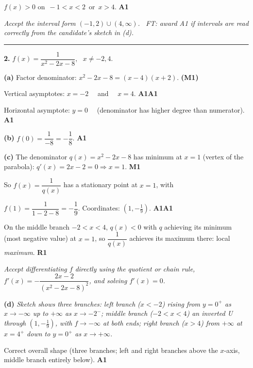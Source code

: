 \documentclass[12pt, twoside]{article}
\begin{document}
$f(x)>0$ on $\,-1<x<2\,$ or $\,x>4$. \hfill \textbf{A1}

\emph{Accept the interval form $(-1,2)\cup(4,\infty)$. \ FT: award A1 if intervals
are read correctly from the candidate's sketch in (d).}

\bigskip\hrule\bigskip

\noindent\textbf{2.} $\displaystyle f(x)=\dfrac{1}{x^{2}-2x-8}$, \ $x\ne -2,4$.

\medskip

\textbf{(a)} Factor denominator: $x^{2}-2x-8=(x-4)(x+2)$. \hfill \textbf{(M1)}

Vertical asymptotes: $x=-2$ \ \ and \ \ $x=4$. \hfill \textbf{A1A1}

Horizontal asymptote: $y=0$
\ \ (denominator has higher degree than numerator). \hfill \textbf{A1}

\medskip

\textbf{(b)} $f(0)=\dfrac{1}{-8}=-\dfrac{1}{8}$. \hfill \textbf{A1}

\medskip

\textbf{(c)} The denominator $q(x)=x^{2}-2x-8$ has minimum at $x=1$ (vertex of
the parabola): $q'(x)=2x-2=0 \Rightarrow x=1$. \hfill \textbf{M1}

\noindent So $f(x)=\dfrac{1}{q(x)}$ has a stationary point at $x=1$, with

$f(1)=\dfrac{1}{1-2-8}=-\dfrac{1}{9}$. Coordinates: $\left(1,-\tfrac{1}{9}\right)$.
\hfill \textbf{A1A1}

On the middle branch $-2<x<4$, $q(x)<0$ with $q$ achieving its minimum (most negative
value) at $x=1$, so $\dfrac{1}{q(x)}$ achieves its maximum there: local \emph{maximum}.
\hfill \textbf{R1}

\emph{Accept differentiating $f$ directly using the quotient or chain rule,
$f'(x)=-\dfrac{2x-2}{(x^{2}-2x-8)^{2}}$, and solving $f'(x)=0$.}

\medskip

\textbf{(d)} \emph{Sketch shows three branches: left branch ($x<-2$) rising from
$y=0^{+}$ as $x\to-\infty$ up to $+\infty$ as $x\to -2^{-}$; middle branch
($-2<x<4$) an inverted U through $\left(1,-\tfrac{1}{9}\right)$, with
$f\to-\infty$ at both ends; right branch ($x>4$) from $+\infty$ at $x=4^{+}$
down to $y=0^{+}$ as $x\to+\infty$.}

Correct overall shape (three branches; left and right branches above the
$x$-axis, middle branch entirely below). \hfill \textbf{A1}
\end{document}
